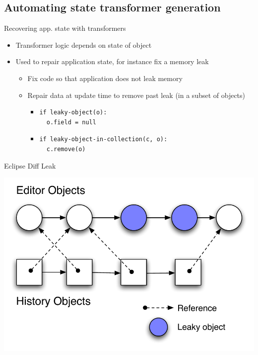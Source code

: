 \subsection{Automating state transformer generation}

\ShowTOC[currentsubsection]

\begin{frame}[fragile]{Recovering app. state with transformers}%
\begin{itemize}
\item Transformer logic depends on state of object
\item Used to repair application state, for instance fix a memory leak
% 
\begin{itemize}
\item Fix code so that application does not leak memory
\item Repair data at update time to remove past leak (in a subset of
objects)
  \begin{itemize}
  \item \begin{verbatim}
if leaky-object(o):
  o.field = null
\end{verbatim}
  \item \begin{verbatim}
if leaky-object-in-collection(c, o):
  c.remove(o)
\end{verbatim}
  \end{itemize}
\end{itemize}
\end{itemize}
\end{frame}

\begin{frame}{Eclipse Diff Leak}%
\begin{center}
\includegraphics[scale=0.75]{images/eclipse-diff-leak}
\end{center}
\end{frame}

